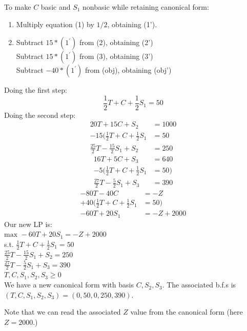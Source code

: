 \documentclass{article}
\begin{document}
To make \(C\) basic and \(S_1\) nonbasic while retaining canonical form:
\begin{enumerate}
    \item Multiply equation (1) by \(1/2\), obtaining (1').
    \item Subtract \(15*(1^{\prime})\)  from (2), obtaining (2')\\
    Subtract \(15*(1^{\prime})\) from (3), obtaining (3') \\
    Subtract \(-40*(1^{\prime})\) from (obj), obtaining (obj') 
\end{enumerate}
Doing the first step: \\
\[
    \frac{1}{2}T+C+\frac{1}{2}S_1=50
\]  
Doing the second step: \\
\begin{align}
    20T+15C+S_2&=1000 \\
    -15(\frac{1}{2}T+C+\frac{1}{2}S_1&=50 \\
    \frac{25}{2}T-\frac{15}{2}S_1+S_2&=250
\end{align}
\begin{align}
    16T+5C+S_3&=640 \\
    -5(\frac{1}{2}T+C+\frac{1}{2}S_1&=50) \\
    \frac{27}{2}T-\frac{5}{2}S_1+S_3&=390
\end{align}
\begin{align}
    -80T-40C&=-Z \\
    +40(\frac{1}{2}T+C+\frac{1}{2}S_1&=50) \\
    -60T+20S_1&=-Z+2000
\end{align}
Our new LP is: \\
\(\text{max }-60T+20S_1=-Z+2000\) \\
s.t. \(\frac{1}{2}T+C+\frac{1}{2}S_1=50\)\\
\(\frac{25}{2}T-\frac{15}{2}S_1+S_2=250\) \\
\(\frac{27}{2}T-\frac{5}{2}S_1+S_3=390\) \\
\(T, C, S_1, S_2, S_3\geq0\)\\


We have a new canonical form with basis \(C, S_2, S_3\). The associated b.f.s 
is \((T,C,S_1,S_2,S_3)=(0, 50, 0, 250, 390)\).

Note that we can read the associated \(Z\) value from the canonical form (here \(Z=2000\).) 
\end{document}
